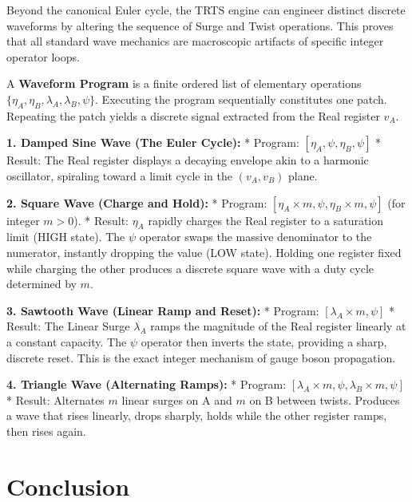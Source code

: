\documentclass[11pt, letterpaper]{article}
\newcommand{\aop}{\eta}
\newcommand{\lop}{\lambda}
\newcommand{\psiop}{\psi}
\begin{document}
Beyond the canonical Euler cycle, the TRTS engine can engineer distinct discrete waveforms by altering the sequence of Surge and Twist operations. This proves that all standard wave mechanics are macroscopic artifacts of specific integer operator loops.

\begin{theorem}\label{thm:waveforms}
\begin{rsbox}
A \textbf{Waveform Program} is a finite ordered list of elementary operations $\{\aop_A, \aop_B, \lop_A, \lop_B, \psiop\}$. Executing the program sequentially constitutes one patch. Repeating the patch yields a discrete signal extracted from the Real register $v_A$.

\textbf{1. Damped Sine Wave (The Euler Cycle):}
*   Program: $[\aop_A, \psiop, \aop_B, \psiop]$
*   Result: The Real register displays a decaying envelope akin to a harmonic oscillator, spiraling toward a limit cycle in the $(v_A, v_B)$ plane.

\textbf{2. Square Wave (Charge and Hold):}
*   Program: $[\aop_A \times m, \psiop, \aop_B \times m, \psiop]$ (for integer $m > 0$).
*   Result: $\aop_A$ rapidly charges the Real register to a saturation limit (HIGH state). The $\psiop$ operator swaps the massive denominator to the numerator, instantly dropping the value (LOW state). Holding one register fixed while charging the other produces a discrete square wave with a duty cycle determined by $m$.

\textbf{3. Sawtooth Wave (Linear Ramp and Reset):}
*   Program: $[\lop_A \times m, \psiop]$
*   Result: The Linear Surge $\lop_A$ ramps the magnitude of the Real register linearly at a constant capacity. The $\psiop$ operator then inverts the state, providing a sharp, discrete reset. This is the exact integer mechanism of gauge boson propagation.

\textbf{4. Triangle Wave (Alternating Ramps):}
*   Program: $[\lop_A \times m, \psiop, \lop_B \times m, \psiop]$
*   Result: Alternates $m$ linear surges on A and $m$ on B between twists. Produces a wave that rises linearly, drops sharply, holds while the other register ramps, then rises again.
\end{rsbox}
\end{theorem}

\section{Conclusion}
\end{document}

